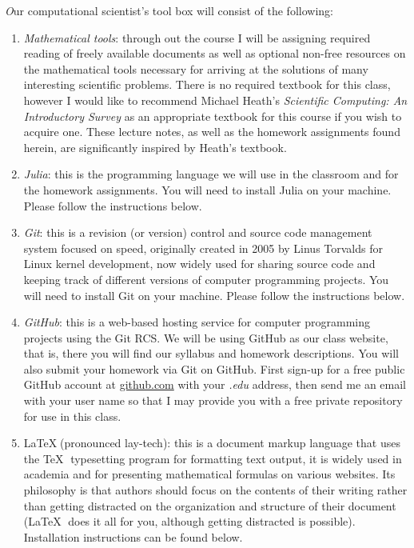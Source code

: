 \documentclass[11pt,a4paper,oneside]{report}
\begin{document}
{\it\huge O}ur computational scientist's tool box will consist of the following: \\
\begin{enumerate}
\item {\it\large Mathematical tools}: through out the course I will be assigning required reading of freely available documents as well as optional non-free resources on the mathematical tools necessary for arriving at the solutions of many interesting scientific problems. There is no required textbook for this class, however I would like to recommend Michael Heath's {\it Scientific Computing: An Introductory Survey} as an appropriate textbook for this course if you wish to acquire one. These lecture notes, as well as the homework assignments found herein, are significantly inspired by Heath's textbook.

\item {\it\large Julia}: this is the programming language we will use in the classroom and for the homework assignments. You will need to install Julia on your machine. Please follow the instructions below.

\item {\it\large Git}: this is a revision (or version) control and source code management system focused on speed, originally created in 2005 by Linus Torvalds for Linux kernel development, now widely used for sharing source code and keeping track of different versions of computer programming projects.  You will need to install Git on your machine. Please follow the instructions below.

\item {\it\large GitHub}: this is a web-based hosting service for computer programming projects using the Git RCS. We will be using GitHub as our class website, that is, there you will find our syllabus and homework descriptions. You will also submit your homework via Git on GitHub. First sign-up for a free public GitHub account at \href{https://github.com/}{github.com} with your \emph{.edu} address, then send me an email with your user name so that I may provide you with a free private repository for use in this class. 

\item \LaTeX $\;$(pronounced lay-tech): this is a document markup language that uses the \TeX $\;$ typesetting program for formatting text output, it is widely used in academia and for presenting mathematical formulas on various websites. Its philosophy is that authors should focus on the contents of their writing rather than getting distracted on the organization and structure of their document (\LaTeX $\;$ does it all for you, although getting distracted is possible). Installation instructions can be found below.\\
\end{enumerate}
\end{document}
